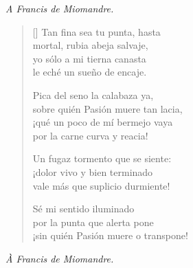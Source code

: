 



\settowidth{\versewidth}{Sobre quién Pasión muere tan lacia,}

\begin{flushright}
{\scriptsize \emph{A Francis de Miomandre.}}
\end{flushright}


\begin{verse}[\versewidth]
  Tan fina sea tu punta, hasta \\
  mortal, rubia abeja salvaje, \\
  yo sólo a mi tierna canasta \\
  le eché un sueño de encaje.

  Pica del seno la calabaza ya, \\
  sobre quién Pasión muere tan lacia, \\
  ¡qué un poco de mí bermejo vaya \\
  por la carne curva y reacia!

  Un fugaz tormento que se siente: \\
  ¡dolor vivo y bien terminado \\
  vale más que suplicio durmiente!

  Sé mi sentido iluminado \\
  por la punta que alerta pone \\
  ¡sin quién Pasión muere o transpone!
\end{verse}

\newpage



\settowidth{\versewidth}{J'ai grand besoin d'un prompt tourment:}

\begin{flushright}
{\scriptsize \emph{À Francis de Miomandre.}}
\end{flushright}

